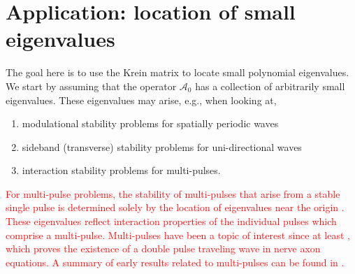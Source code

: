 \documentclass[review,onefignum,onetabnum]{siamart171218}
\newcommand{\rmi}{\mathrm{i}}
\newcommand{\calA}{\mathcal{A}}
\newcommand{\revised}[1]{ \textcolor{red}{#1} }
\begin{document}

\section{Application: location of small eigenvalues}\label{s:5}

The goal here is to use the Krein matrix to locate small polynomial eigenvalues.
We start by assuming that the operator $\calA_0$ has a collection of arbitrarily small eigenvalues. These eigenvalues may arise, e.g., when looking at,
\begin{enumerate}
  \item modulational stability problems for spatially periodic waves
  \item sideband (transverse) stability problems for uni-directional waves
  \item interaction stability problems for multi-pulses.
\end{enumerate}
\revised{
For multi-pulse problems, the stability of multi-pulses that arise from a stable single pulse is determined solely by the location of eigenvalues near the origin \cite{sandstede:som98}. These eigenvalues reflect interaction properties of the individual pulses which comprise a multi-pulse. Multi-pulses have been a topic of interest since at least \cite{Evans1982}, which proves the existence of a double pulse traveling wave in nerve axon equations. A summary of early results related to multi-pulses can be found in \cite[Section 1]{sandstede:som98}.
}
\end{document}
